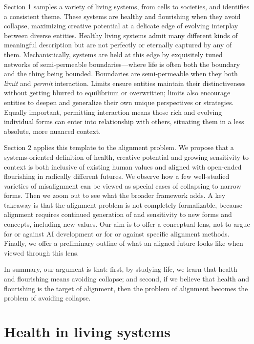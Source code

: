 \documentclass[12pt]{article}
\begin{document}
Section 1 samples a variety of living systems, from cells to societies, and identifies a consistent theme. These systems are healthy and flourishing when they avoid collapse, maximizing creative potential at a delicate edge of evolving interplay between diverse entities. Healthy living systems admit many different kinds of meaningful description but are not perfectly or eternally captured by any of them. Mechanistically, systems are held at this edge by exquisitely tuned networks of semi-permeable boundaries---where life is often both the boundary and the thing being bounded. Boundaries are semi-permeable when they both \textit{limit} and \textit{permit} interaction. Limits ensure entities maintain their distinctiveness without getting blurred to equilibrium or overwritten; limits also encourage entities to deepen and generalize their own unique perspectives or strategies. Equally important, permitting interaction means those rich and evolving individual forms can enter into relationship with others, situating them in a less absolute, more nuanced context. 

Section 2 applies this template to the alignment problem. We propose that a systems-oriented definition of health, creative potential and growing sensitivity to context is both inclusive of existing human values and aligned with open-ended flourishing in radically different futures. We observe how a few well-studied varieties of misalignment can be viewed as special cases of collapsing to narrow forms. Then we zoom out to see what the broader framework adds. A key takeaway is that the alignment problem is not completely formalizable, because alignment requires continued generation of and sensitivity to new forms and concepts, including new values. Our aim is to offer a conceptual lens, not to argue for or against AI development or for or against specific alignment methods. Finally, we offer a preliminary outline of what an aligned future looks like when viewed through this lens.  


In summary, our argument is that: first, by studying life, we learn that health and flourishing means avoiding collapse; and second, if we believe that health and flourishing is the target of alignment, then the problem of alignment becomes the problem of avoiding collapse.


\section{Health in living systems}
\end{document}
